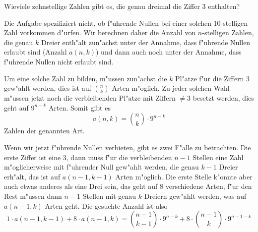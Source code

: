 Wieviele zehnstellige Zahlen gibt es, die genau dreimal die Ziffer
3 enthalten?

\begin{loesung}
Die Aufgabe spezifiziert nicht, ob f"uhrende Nullen bei einer solchen
10-stelligen Zahl
vorkommen d"urfen. Wir berechnen daher die Anzahl von $n$-stelligen
Zahlen, die genau $k$ Dreier enth"alt zun"achst unter der Annahme,
dass f"uhrende Nullen erlaubt sind (Anzahl $a(n,k)$) und dann auch
noch unter der Annahme, dass f"uhrende Nullen nicht erlaubt sind.

Um eine solche Zahl zu bilden, m"ussen zun"achst die $k$ Pl"atze
f"ur die Ziffern 3 gew"ahlt werden, dies ist auf $\binom{n}{k}$
Arten m"oglich. Zu jeder solchen Wahl m"ussen jetzt noch die
verbleibenden Pl"atze mit Ziffern $\ne 3$ besetzt werden, dies
geht auf $9^{n-k}$ Arten. Somit gibt es
$$a(n,k)=\binom{n}{k}\cdot9^{n-k}$$
Zahlen der genannten Art.

Wenn wir jetzt f"uhrende Nullen verbieten, gibt es zwei F"alle zu
betrachten. Die erste Ziffer ist eine $3$, dann muss f"ur die
verbleibenden $n-1$ Stellen eine Zahl m"oglicherweise mit f"uhrender
Null gew"ahlt werden, die genau $k-1$ Dreier erh"alt, das ist auf $a(n-1,k-1)$
Arten m"oglich. Die erste Stelle k"onnte aber auch etwas anderes
als eine Drei sein, das geht auf $8$ verschiedene Arten, f"ur den
Rest m"ussen dann $n-1$ Stellen mit genau $k$ Dreiern gew"ahlt
werden, was auf $a(n-1,k)$ Arten geht. Die gesuchte Anzahl ist also
\[
1\cdot a(n-1,k-1) + 8\cdot a(n-1,k)=
\binom{n-1}{k-1}\cdot 9^{n-k}+8\cdot\binom{n-1}{k}\cdot 9^{n-1-k}
\]
\end{loesung}

